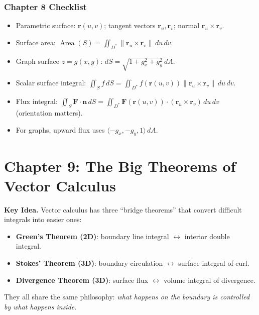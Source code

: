 \documentclass[12pt]{article}
\numberwithin{equation}{section}
\newcommand{\vect}[1]{\boldsymbol{#1}}   %
\theoremstyle{plain}
\theoremstyle{definition}
\theoremstyle{remark}
\newenvironment{keyidea}{\begin{tcolorbox}\textbf{Key Idea.}}{\end{tcolorbox}}
\begin{document}
\subsubsection*{Chapter 8 Checklist}
\begin{itemize}
\item Parametric surface: $\vect r(u,v)$; tangent vectors $\vect r_u,\vect r_v$; normal $\vect r_u\times \vect r_v$.
\item Surface area: $\displaystyle \operatorname{Area}(S)=\iint_{D^\ast}\|\vect r_u\times\vect r_v\|\,du\,dv$.
\item Graph surface $z=g(x,y)$: $\displaystyle dS=\sqrt{1+g_x^2+g_y^2}\,dA$.
\item Scalar surface integral: $\displaystyle \iint_S f\,dS=\iint_{D^\ast} f(\vect r(u,v))\|\vect r_u\times\vect r_v\|\,du\,dv$.
\item Flux integral: $\displaystyle \iint_S \vect F\cdot\vect n\,dS=\iint_{D^\ast}\vect F(\vect r(u,v))\cdot(\vect r_u\times\vect r_v)\,du\,dv$ (orientation matters).
\item For graphs, upward flux uses $\langle -g_x,-g_y,1\rangle\,dA$.
\end{itemize}



\section{Chapter 9: The Big Theorems of Vector Calculus}

\begin{keyidea}
Vector calculus has three “bridge theorems” that convert difficult integrals into easier ones:

\begin{itemize}
\item \textbf{Green's Theorem (2D)}: boundary line integral $\leftrightarrow$ interior double integral.
\item \textbf{Stokes' Theorem (3D)}: boundary circulation $\leftrightarrow$ surface integral of curl.
\item \textbf{Divergence Theorem (3D)}: surface flux $\leftrightarrow$ volume integral of divergence.
\end{itemize}

They all share the same philosophy: \emph{what happens on the boundary is controlled by what happens inside}.
\end{keyidea}
\end{document}
